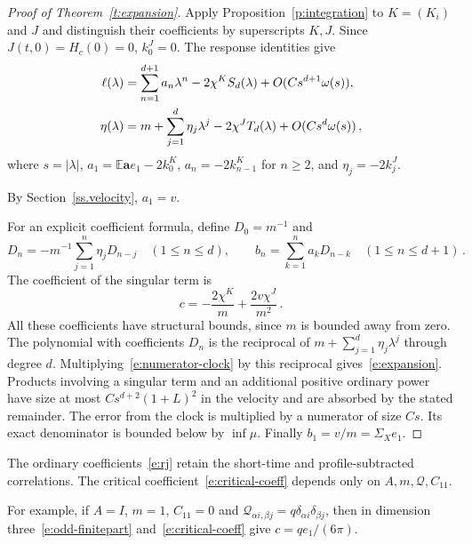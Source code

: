 \documentclass[11pt]{amsart}
\theoremstyle{definition}
\theoremstyle{remark}
\numberwithin{equation}{section}
\newcommand{\E}{\mathbb E}
\renewcommand{\a}{\mathbf a}
\begin{document}
\begin{proof}[Proof of Theorem~\ref{t:expansion}]
Apply Proposition~\ref{p:integration} to $K=(K_i)$ and $J$ and distinguish their coefficients by superscripts $K,J$. Since $J(t,0)=H_c(0)=0$, $k_0^J=0$. The response identities give
\begin{align}\label{e:numerator-clock}
 \ell(\lambda)
 &=\sum_{n=1}^{d+1}a_n\lambda^n-2\chi^K S_d(\lambda)
                  +O(Cs^{d+1}\omega(s)),\notag\\
 \eta(\lambda)
 &=m+\sum_{j=1}^d\eta_j\lambda^j-2\chi^J T_d(\lambda)
                  +O(Cs^d\omega(s))\, ,
\end{align}
where $s=|\lambda|$, $a_1=\E \a e_1-2k_0^K$, $a_n=-2k_{n-1}^K$ for $n\geq2$, and $\eta_j=-2k_j^J$.

By Section~\ref{ss.velocity}, $a_1=v$.

For an explicit coefficient formula, define $D_0=m^{-1}$ and
\begin{equation}\label{e:division}
 D_n=-m^{-1}\sum_{j=1}^n\eta_jD_{n-j}\quad(1\leq n\leq d),
 \qquad b_n=\sum_{k=1}^n a_kD_{n-k}\quad(1\leq n\leq d+1)\, .
\end{equation}
The coefficient of the singular term is
\begin{equation}\label{e:critical-coeff}
 c=-\frac{2\chi^K}{m}+\frac{2v\chi^J}{m^2}\, .
\end{equation}
All these coefficients have structural bounds, since $m$ is bounded away from zero. The polynomial with coefficients $D_n$ is the reciprocal of $m+\sum_{j=1}^d\eta_j\lambda^j$ through degree $d$. Multiplying~\eqref{e:numerator-clock} by this reciprocal gives~\eqref{e:expansion}. Products involving a singular term and an additional positive ordinary power have size at most $Cs^{d+2}(1+L)^2$ in the velocity and are absorbed by the stated remainder. The error from the clock is multiplied by a numerator of size $Cs$. Its exact denominator is bounded below by $\inf\mu$. Finally $b_1=v/m=\Sigma_Xe_1$.
\end{proof}

The ordinary coefficients~\eqref{e:rj} retain the short-time and profile-subtracted correlations. The critical coefficient~\eqref{e:critical-coeff} depends only on $A,m,\mathscr Q,C_{11}$.

For example, if $A=I$, $m=1$, $C_{11}=0$ and $\mathscr Q_{\alpha i,\beta j}=q\delta_{\alpha i}\delta_{\beta j}$, then in dimension three~\eqref{e:odd-finitepart} and~\eqref{e:critical-coeff} give $c=qe_1/(6\pi)$.
\end{document}
